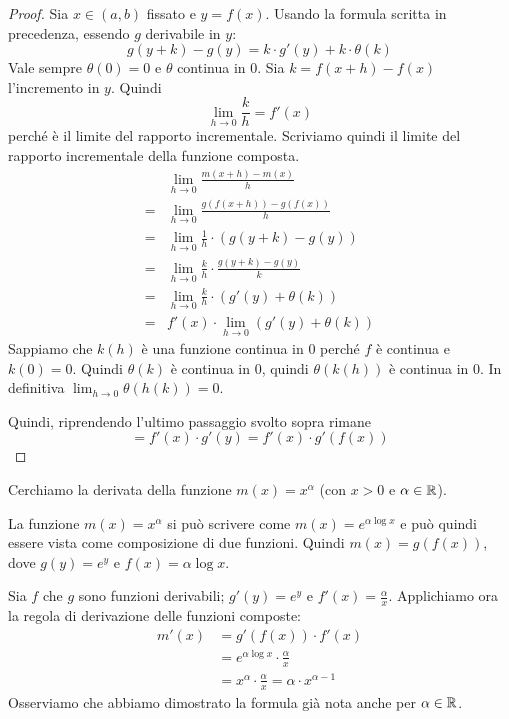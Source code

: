 \begin{proof}
Sia $x \in (a,b)$ fissato e $y = f(x)$. Usando la formula scritta in precedenza, essendo $g$ derivabile in $y$:
\begin{equation*}
g(y + k) - g(y) = k \cdot g'(y) + k \cdot \theta(k)
\end{equation*}
Vale sempre $\theta(0) = 0$ e $\theta$ continua in 0. Sia $k = f(x+h) - f(x)$ l'incremento in $y$. Quindi
\begin{equation*}
\lim_{h \to 0} \frac{k}{h} = f'(x)
\end{equation*}
perché è il limite del rapporto incrementale. Scriviamo quindi il limite del rapporto incrementale della funzione composta.
\begingroup
\addtolength{\jot}{1ex}
\begin{align*}
& \lim_{h \to 0} \frac{m(x+h) - m(x)}{h} \\
= & \lim_{h \to 0} \frac{g(f(x+h)) - g(f(x))}{h} \\
= & \lim_{h \to 0} \frac{1}{h} \cdot (g(y+k) - g(y)) \\
= & \lim_{h \to 0} \frac{k}{h} \cdot \frac{g(y+k) - g(y)}{k} \\
= & \lim_{h \to 0} \frac{k}{h} \cdot (g'(y) + \theta (k)) \\
= & f'(x) \cdot \lim_{h \to 0} (g'(y) + \theta (k))
\end{align*}
\endgroup
Sappiamo che $k(h)$ è una funzione continua in 0 perché $f$ è continua e $k(0) = 0$. Quindi $\theta(k)$ è continua in 0, quindi $\theta(k(h))$ è continua in 0. In definitiva $\lim_{h \to 0} \theta (h(k)) = 0$.

Quindi, riprendendo l'ultimo passaggio svolto sopra rimane
\begin{equation*}
= f'(x) \cdot g'(y) = f'(x) \cdot g'(f(x))
\end{equation*}
\end{proof}

\begin{example}
Cerchiamo la derivata della funzione $m(x) = x^\alpha$ (con $x > 0$ e $\alpha \in \mathbb R$).

La funzione $m(x) = x^\alpha$ si può scrivere come $m(x) = e^{\alpha \log x}$ e può quindi essere vista come composizione di due funzioni. Quindi $m(x) = g(f(x))$, dove $g(y) = e^y$ e $f(x) = \alpha \log x$.

Sia $f$ che $g$ sono funzioni derivabili; $g'(y) = e^y$ e $f'(x) = \frac{\alpha}{x}$. Applichiamo ora la regola di derivazione delle funzioni composte:
\begingroup
\addtolength{\jot}{1ex}
\begin{align*}
m'(x) &= g'(f(x)) \cdot f'(x) \\ 
&= e^{\alpha \log x} \cdot \frac{\alpha}{x} \\
&= x^\alpha \cdot \frac{\alpha}{x} = \alpha \cdot x^{\alpha -1}
\end{align*}
\endgroup
Osserviamo che abbiamo dimostrato la formula già nota anche per $\alpha \in \mathbb R$.
\end{example}

